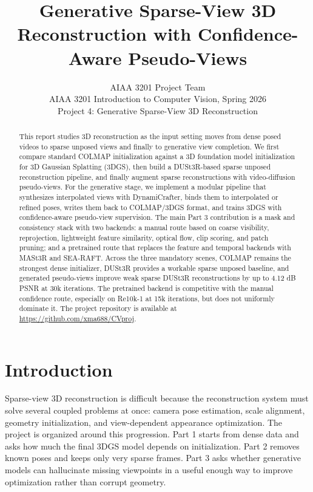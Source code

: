 \documentclass[10pt,twocolumn,letterpaper]{article}
\title{Generative Sparse-View 3D Reconstruction with Confidence-Aware Pseudo-Views}
\author{
  AIAA 3201 Project Team\\
  \small AIAA 3201 Introduction to Computer Vision, Spring 2026\\
  \small Project 4: Generative Sparse-View 3D Reconstruction
}
\newcommand{\repo}{\url{https://github.com/xma688/CVproj}}
\begin{document}
\maketitle

\begin{abstract}
This report studies 3D reconstruction as the input setting moves from dense posed videos to sparse unposed views and finally to generative view completion.  We first compare standard COLMAP initialization against a 3D foundation model initialization for 3D Gaussian Splatting (3DGS), then build a DUSt3R-based sparse unposed reconstruction pipeline, and finally augment sparse reconstructions with video-diffusion pseudo-views.  For the generative stage, we implement a modular pipeline that synthesizes interpolated views with DynamiCrafter, binds them to interpolated or refined poses, writes them back to COLMAP/3DGS format, and trains 3DGS with confidence-aware pseudo-view supervision.  The main Part 3 contribution is a mask and consistency stack with two backends: a manual route based on coarse visibility, reprojection, lightweight feature similarity, optical flow, clip scoring, and patch pruning; and a pretrained route that replaces the feature and temporal backends with MASt3R and SEA-RAFT.  Across the three mandatory scenes, COLMAP remains the strongest dense initializer, DUSt3R provides a workable sparse unposed baseline, and generated pseudo-views improve weak sparse DUSt3R reconstructions by up to 4.12 dB PSNR at 30k iterations.  The pretrained backend is competitive with the manual confidence route, especially on Re10k-1 at 15k iterations, but does not uniformly dominate it.  The project repository is available at \repo.
\end{abstract}

\section{Introduction}

Sparse-view 3D reconstruction is difficult because the reconstruction system must solve several coupled problems at once: camera pose estimation, scale alignment, geometry initialization, and view-dependent appearance optimization.  The project is organized around this progression.  Part 1 starts from dense data and asks how much the final 3DGS model depends on initialization.  Part 2 removes known poses and keeps only very sparse frames.  Part 3 asks whether generative models can hallucinate missing viewpoints in a useful enough way to improve optimization rather than corrupt geometry.
\end{document}
